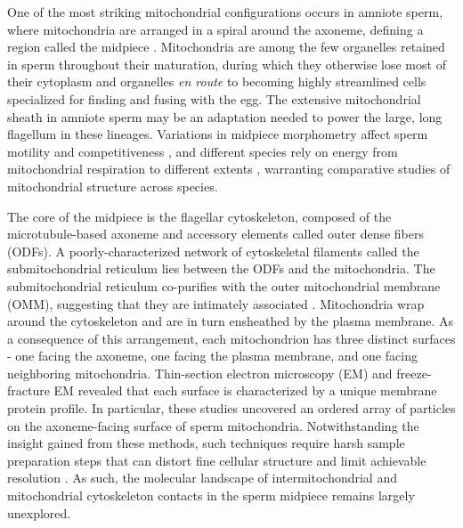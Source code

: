 One of the most striking mitochondrial configurations occurs in amniote sperm, where mitochondria are arranged in a spiral around the axoneme, defining a region called the midpiece \cite{Fawcett1970, Fawcett1975}. Mitochondria are among the few organelles retained in sperm throughout their maturation, during which they otherwise lose most of their cytoplasm and organelles \emph{en route} to becoming highly streamlined cells specialized for finding and fusing with the egg. The extensive mitochondrial sheath in amniote sperm may be an adaptation needed to power the large, long flagellum in these lineages. Variations in midpiece morphometry affect sperm motility and competitiveness \cite{Firman2010, Fisher2016}, and different species rely on energy from mitochondrial respiration to different extents \cite{Tourmente2015, Marin2003}, warranting comparative studies of mitochondrial structure across species.

The core of the midpiece is the flagellar  cytoskeleton, composed of the microtubule-based axoneme and accessory elements called outer dense fibers (ODFs). A poorly-characterized network of cytoskeletal filaments called the submitochondrial reticulum lies between the ODFs and the mitochondria. The submitochondrial reticulum co-purifies with the outer mitochondrial membrane (OMM), suggesting that they are intimately associated \cite{Olson1986, Olson1990}. Mitochondria wrap around the cytoskeleton and are in turn ensheathed by the plasma membrane. As a consequence of this arrangement, each mitochondrion has three distinct surfaces \cite{Olson1992} - one facing the axoneme, one facing the plasma membrane, and one facing neighboring mitochondria. Thin-section electron microscopy (EM) \cite{Olson1992} and freeze-fracture EM \cite{Friend1981, Woolley2005} revealed that each surface is characterized by a unique membrane protein profile. In particular, these studies uncovered an ordered array of particles on the axoneme-facing surface of sperm mitochondria. Notwithstanding the insight gained from these methods, such techniques require harsh sample preparation steps that can distort fine cellular structure and limit achievable resolution \cite{Al-Amoudi2004}. As such, the molecular landscape of intermitochondrial and mitochondrial cytoskeleton contacts in the sperm midpiece remains largely unexplored.

